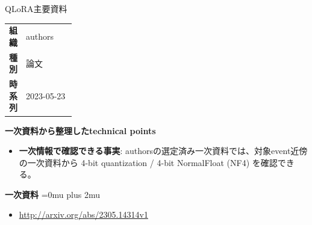 \begin{technicalnote}{QLoRA}{主要資料}
\begingroup
\begin{tabularx}{\linewidth}{@{}>{\bfseries}p{0.22\linewidth}X@{}}
組織 & authors \\
種別 & 論文 \\
時系列 & 2023-05-23 \\
\end{tabularx}
\smallskip
{\bfseries 一次資料から整理したtechnical points}
\begin{itemize}[leftmargin=1.5em,itemsep=0.35em]
\item \textbf{一次情報で確認できる事実}: authorsの選定済み一次資料では、対象event近傍の一次資料から 4-bit quantization / 4-bit NormalFloat (NF4) を確認できる。
\end{itemize}
\begin{minipage}{\linewidth}
\begin{samepage}
{\bfseries 一次資料}
\begingroup\sloppy
\Urlmuskip=0mu plus 2mu\relax
\begin{itemize}[leftmargin=1.5em,itemsep=0.25em]
\item {\scriptsize\url{http://arxiv.org/abs/2305.14314v1}}
\end{itemize}
\endgroup
\end{samepage}
\end{minipage}
\endgroup
\end{technicalnote}
\medskip

